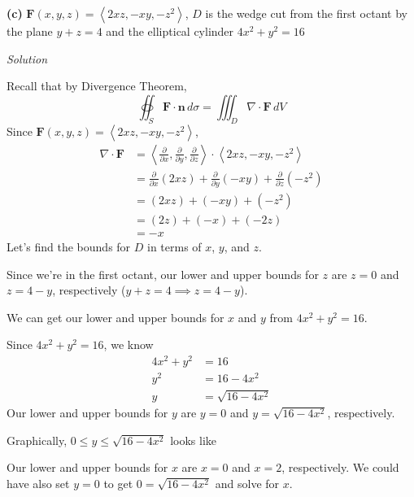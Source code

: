 \documentclass{article}
\newcommand{\lrp}[1]{\left( #1 \right)}
\newcommand{\lra}[1]{\left\langle #1 \right\rangle}
\newcommand{\F}[0]{\mathbf{F}}
\newcommand{\n}[0]{{\mathbf{n}}}
\newcommand{\Solution}{\textit{Solution}}
\begin{document}
{}\textbf{(c)} $\F(x,y,z)=\lra{2xz,-xy,-z^2}$, $D$ is the wedge cut from the first octant by the plane $y+z=4$ and the elliptical cylinder $4x^2+y^2=16$

\Solution

Recall that by Divergence Theorem,
\begin{equation*}
    \oiint_S \F\cdot \n \,d\sigma = \iiint_D \nabla \cdot \F\,dV
\end{equation*}
Since $\F(x,y,z)=\lra{2xz,-xy,-z^2}$,
\begin{align*}
    \nabla \cdot \F&=\lra{\frac{\partial }{\partial x},\frac{\partial }{\partial y},\frac{\partial }{\partial z}}\cdot \lra{2xz,-xy,-z^2}\\
    &=\frac{\partial}{\partial x}\lrp{2xz}+\frac{\partial}{\partial y}\lrp{-xy}+\frac{\partial}{\partial z}\lrp{-z^2}\\
    &=\lrp{2xz}+\lrp{-xy}+\lrp{-z^2}\\
    &=\lrp{2z}+\lrp{-x}+\lrp{-2z}\\
    &=-x
\end{align*}
Let's find the bounds for $D$ in terms of $x$, $y$, and $z$.

Since we're in the first octant, our lower and upper bounds for $z$ are $z=0$ and $z=4-y$, respectively ($y+z=4\implies z=4-y$).

We can get our lower and upper bounds for $x$ and $y$ from  $4x^2+y^2=16$. 

Since $4x^2+y^2=16$, we know
\begin{align*}
    4x^2+y^2&=16\\
    y^2&=16-4x^2\\
    y&=\sqrt{16-4x^2}\tag{we're in first octant, $y\geq 0$}
\end{align*}
Our lower and upper bounds for $y$ are $y=0$ and $y=\sqrt{16-4x^2}$, respectively.

Graphically, $0\leq y\leq \sqrt{16-4x^2}$ looks like
\begin{center}
\end{center}
Our lower and upper bounds for $x$ are $x=0$ and $x=2$, respectively. We could have also set $y=0$ to get $0=\sqrt{16-4x^2}$ and solve for $x$.
\end{document}
